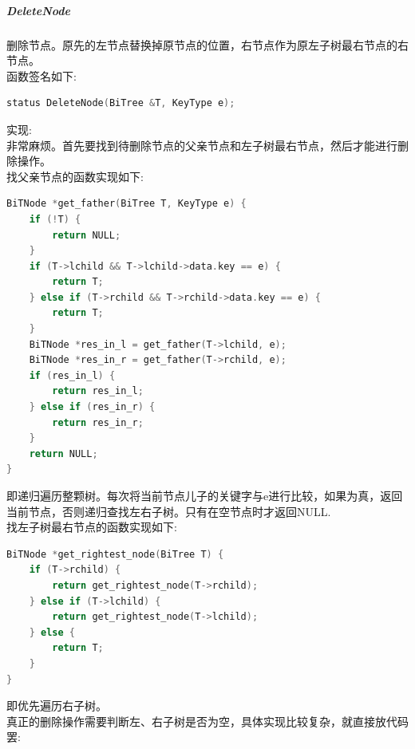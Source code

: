 \documentclass[supercite]{Experimental_Report}
\theoremstyle{definition}
\begin{document}
\subparagraph{DeleteNode}
\noindent
删除节点。原先的左节点替换掉原节点的位置，右节点作为原左子树最右节点的右节点。 \\
函数签名如下:
\begin{lstlisting}[language=C++, frame=single]
status DeleteNode(BiTree &T, KeyType e);
\end{lstlisting}
实现: \\
非常麻烦。首先要找到待删除节点的父亲节点和左子树最右节点，然后才能进行删除操作。 \\
找父亲节点的函数实现如下:
\begin{lstlisting}[language=C++, frame=single]
BiTNode *get_father(BiTree T, KeyType e) {
	if (!T) {
		return NULL;
	}
	if (T->lchild && T->lchild->data.key == e) {
		return T;
	} else if (T->rchild && T->rchild->data.key == e) {
		return T;
	}
	BiTNode *res_in_l = get_father(T->lchild, e);
	BiTNode *res_in_r = get_father(T->rchild, e);
	if (res_in_l) {
		return res_in_l;
	} else if (res_in_r) {
		return res_in_r;
	}
	return NULL;
}
\end{lstlisting}
即递归遍历整颗树。每次将当前节点儿子的关键字与e进行比较，如果为真，返回当前节点，否则递归查找左右子树。只有在空节点时才返回NULL. \\
找左子树最右节点的函数实现如下:
\begin{lstlisting}[language=C++, frame=single]
BiTNode *get_rightest_node(BiTree T) {
	if (T->rchild) {
		return get_rightest_node(T->rchild);
	} else if (T->lchild) {
		return get_rightest_node(T->lchild);
	} else {
		return T;
	}
}
\end{lstlisting}
即优先遍历右子树。\\
真正的删除操作需要判断左、右子树是否为空，具体实现比较复杂，就直接放代码罢:
\end{document}
